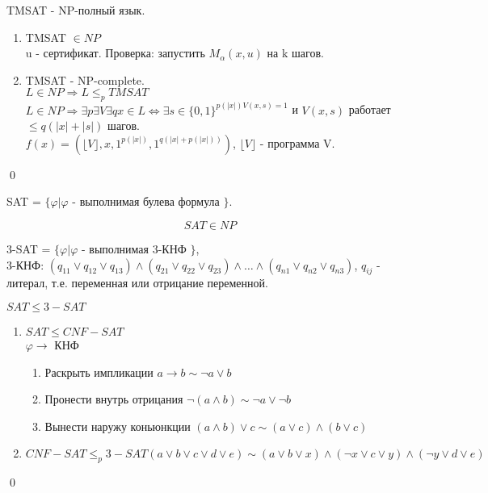 	\begin{theorem}
		TMSAT - NP-полный язык.
		\proof
		\begin{enumerate}
			\item TMSAT $\in NP$\\
			u - сертификат. Проверка: запустить $M_{\alpha}(x,u)$ на k шагов.
			
			\item TMSAT - NP-complete.\\
			$L \in NP \Rightarrow L \le_p TMSAT$\\
			$L \in NP \Rightarrow \exists p \exists V \exists q x \in L \Leftrightarrow \exists s \in \{0,1\}^{p(|x|) V(x,s) = 1}$
			и $V(x,s)$ работает $\le q(|x| + |s|)$ шагов.\\
			$f(x) = (\lfloor V \rfloor,x,1^{p(|x|)},1^{q(|x| + p(|x|))})$, $\lfloor V \rfloor$ - программа V.
		\end{enumerate}
		\qed
	\end{theorem}
	
	\begin{definition}
		SAT = $\{\varphi | \varphi$ - выполнимая булева формула $\}$.
	\end{definition}
	$$SAT \in NP$$
	
	\begin{definition}
		3-SAT = $\{ \varphi | \varphi$ - выполнимая 3-КНФ $\}$, \\
		3-КНФ: $(q_{11} \vee q_{12} \vee q_{13}) \wedge (q_{21} \vee q_{22} \vee q_{23}) \wedge \ldots \wedge (q_{n1} \vee q_{n2} \vee q_{n3})$,
		$q_{ij}$ - литерал, т.е. переменная или отрицание переменной.
	\end{definition}
	
	\begin{statement}
		$SAT \le 3-SAT$
		\proof
		\begin{enumerate}
			\item $SAT \le CNF-SAT$\\
			$\varphi \to$ КНФ
			\begin{enumerate}
				\item Раскрыть импликации $a \to b \sim \neg a \vee b $
				\item Пронести внутрь отрицания $\neg(a \wedge b) \sim \neg a \vee \neg b$
				\item Вынести наружу коньюнкции $(a \wedge b) \vee c \sim (a \vee c) \wedge (b \vee c)$
			\end{enumerate}
			
			\item $CNF - SAT \le_p 3-SAT (a \vee b \vee c \vee d \vee e) \sim (a \vee b \vee x) \wedge (\neg x \vee c \vee y) \wedge (\neg y \vee d \vee e)$
		\end{enumerate}
	\end{statement}
	\qed
	
